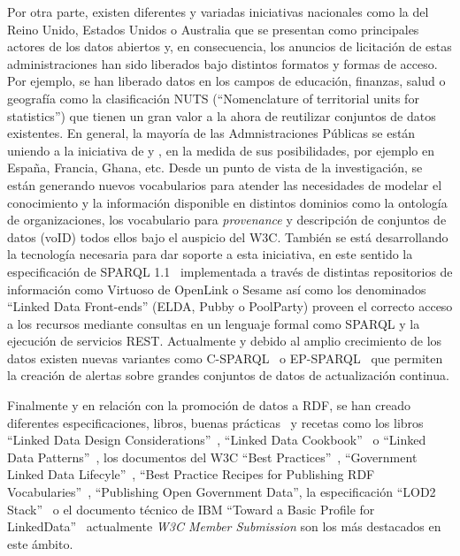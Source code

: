 \documentclass[a4paper,final,11pt,fleqn,twoside]{book}  %
\begin{document}
Por otra parte, existen diferentes y variadas iniciativas nacionales como la del Reino Unido, Estados 
Unidos o Australia que se presentan como principales actores de los datos abiertos y, en consecuencia, 
los anuncios de licitación de estas administraciones han sido liberados bajo distintos formatos y formas 
de acceso. Por ejemplo, se han liberado datos en los campos de educación, finanzas, salud o geografía como 
la clasificación NUTS (``Nomenclature of territorial units for statistics'') que tienen un gran valor a la ahora 
de reutilizar conjuntos de datos existentes. En general, la mayoría de las Admnistraciones Públicas 
se están uniendo a la iniciativa de \opendata y \linkeddata, en la medida de sus posibilidades, por ejemplo 
en España, Francia, Ghana, etc. Desde un punto de vista de la investigación, se están generando nuevos vocabularios 
para atender las necesidades de modelar el conocimiento y la información disponible 
en distintos dominios como la ontología de organizaciones, los vocabulario para \textit{provenance} y 
descripción de conjuntos de datos (voID) todos ellos bajo el auspicio del W3C. También se está desarrollando la tecnología necesaria 
para dar soporte a esta iniciativa, en este sentido la especificación de SPARQL 1.1~\cite{Sparql11} implementada a través de distintas 
repositorios de información como Virtuoso de OpenLink o Sesame así como los denominados 
``Linked Data Front-ends'' (ELDA, Pubby o PoolParty) proveen el correcto acceso a los recursos mediante 
consultas en un lenguaje formal como SPARQL y la ejecución de servicios REST. Actualmente y 
debido al amplio crecimiento de los datos existen nuevas variantes como C-SPARQL~\cite{Barbieri:2010:QRS:1860702.1860705} o 
EP-SPARQL~\cite{Anicic:2011:EUL:1963405.1963495} que permiten la creación de alertas sobre grandes conjuntos de datos de actualización continua.

Finalmente y en relación con la promoción de datos a RDF, se han creado diferentes especificaciones, 
libros, buenas prácticas~\cite{Berners-Lee-2006, okfn} y recetas como los libros ``Linked Data Design Considerations''~\cite{Heath_Bizer_2011}, 
``Linked Data Cookbook''~\cite{linked-data-cookbook} o “Linked Data Patterns”~\cite{linked-data-patterns}, los documentos 
del W3C ``Best Practices''~\cite{publishing-ogd}, ``Government Linked Data Lifecyle''~\cite{gld-group}, 
``Best Practice Recipes for Publishing RDF Vocabularies''~\cite{Berr08}, ``Publishing Open  Government Data'', la especificación ``LOD2 Stack''~\cite{lod2-stack} 
o el documento técnico de IBM ``Toward a Basic Profile for LinkedData''~\cite{basic-profile-ibm}  actualmente 
\textit{W3C Member Submission} son los más destacados en este ámbito.
\end{document}
